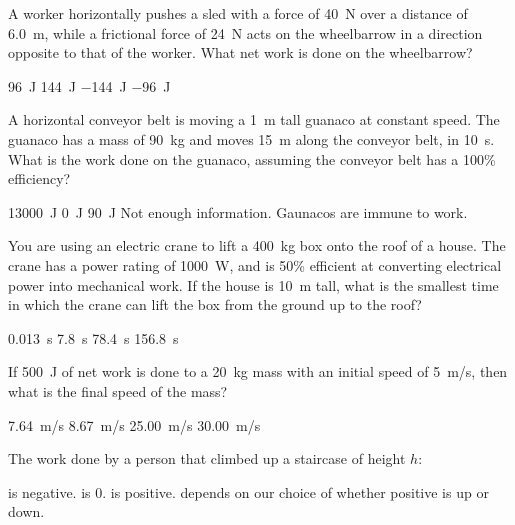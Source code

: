\question A worker horizontally pushes a sled with a force of \SI{40}{N} over a distance of \SI{6.0}{m}, while a frictional force of \SI{24}{N} acts on the wheelbarrow in a direction opposite to that of the worker. What net work is done on the wheelbarrow?
\begin{checkboxes}
\CorrectChoice \SI{96}{J} \correct
\choice \SI{144}{J}
\choice \SI{-144}{J}
\choice \SI{-96}{J}
\end{checkboxes}


\question A horizontal conveyor belt is moving a \SI{1}{m} tall guanaco at constant speed. The guanaco has a mass of \SI{90}{kg} and moves \SI{15}{m} along the conveyor belt, in \SI{10}{s}. What is the work done on the guanaco, assuming the conveyor belt has a 100\% efficiency?
\begin{checkboxes}
\choice \SI{13000}{J}
\CorrectChoice \SI{0}{J} \correct
\choice \SI{90}{J}
\choice Not enough information.
\choice Gaunacos are immune to work.
\end{checkboxes}

\question You are using an electric crane to lift a \SI{400}{kg} box onto the roof of a house. The crane has a power rating of \SI{1000}{W}, and is 50\% efficient at converting electrical power into mechanical work. If the house is \SI{10}{m} tall, what is the smallest time in which the crane can lift the box from the ground up to the roof?
\begin{checkboxes} 
\choice \SI{0.013}{s}
\choice \SI{7.8}{s}
\CorrectChoice \SI{78.4}{s} \correct
\choice \SI{156.8}{s}
\end{checkboxes}

\question If \SI{500}{J} of net work is done to a \SI{20}{kg} mass with an initial speed of \SI{5}{m/s}, then what is the final speed of the mass?
\begin{checkboxes}
\choice \SI{7.64}{m/s}
\CorrectChoice \SI{8.67}{m/s}
\choice \SI{25.00}{m/s}
\choice \SI{30.00}{m/s}
\end{checkboxes}

\question The work done by a person that climbed up a staircase of height $h$:
\begin{checkboxes}
\choice is negative.
\choice is 0.
\CorrectChoice is positive.
\choice depends on our choice of whether positive is up or down.
\end{checkboxes}

